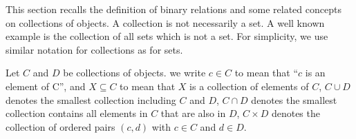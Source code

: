 This section recalls the definition of binary relations and some related concepts on collections of objects.
A collection is not necessarily a set. A well known example is the collection of all sets which is not a set. For simplicity, we use similar notation for collections as for sets.  
\begin{notation}
    Let $C$ and $D$ be collections of objects. 
    we write $c \mathop{\in} C$ to mean that \enquote{$c$ is an element of C}, 
    and $X \mathop{\subseteq} C$ to mean that $X$ is a collection of elements of $C$,
    $C \mathop{\cup} D$ denotes the smallest collection including $C$ and $D$,
    $C \mathop{\cap} D$ denotes the smallest collection contains all elements in $C$ that are also in $D$,
    $C \mathop{\times} D$ denotes the collection of ordered pairs $(c,d)$ with $c \mathop{\in} C$ and $d \mathop{\in} D$.
  \end{notation} 
    
    
